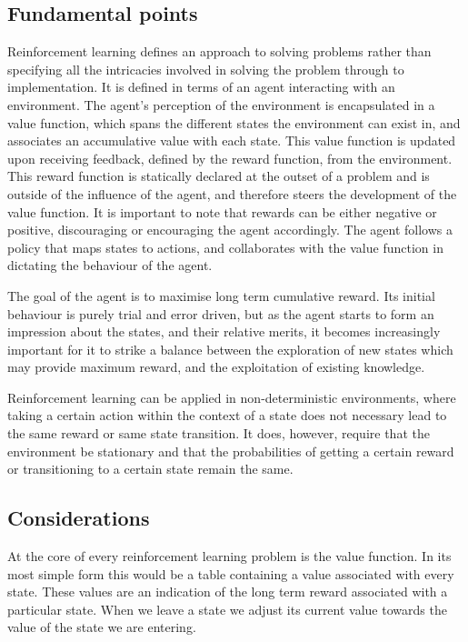 \documentclass[a4paper]{article}%
\begin{document}
\subsection{Fundamental points}
Reinforcement learning defines an approach to solving problems rather than specifying all the intricacies involved in solving the problem through to implementation. It is defined in terms of an agent interacting with an environment. The agent's perception of the environment is encapsulated in a value function, which spans the different states the environment can exist in, and associates an accumulative value with each state. This value function is updated upon receiving feedback, defined by the reward function, from the environment. This reward function is statically declared at the outset of a problem and is outside of the influence of the agent, and therefore steers the development of the value function. It is important to note that rewards can be either negative or positive, discouraging or encouraging the agent accordingly. The agent follows a policy that maps states to actions, and collaborates with the value function in dictating the behaviour of the agent\citep{suttonbarto}.

The goal of the agent is to maximise long term cumulative reward. Its initial behaviour is purely trial and error driven, but as the agent starts to form an impression about the states, and their relative merits, it becomes increasingly important for it to strike a balance between the exploration of new states which may provide maximum reward, and the exploitation of existing knowledge\citep{suttonbarto}.

Reinforcement learning can be applied in non-deterministic environments, where taking a certain action within the context of a state does not necessary lead to the same reward or same state transition. It does, however, require that the environment be stationary and that the probabilities of getting a certain reward or transitioning to a certain state remain the same\citep{kaelbling96reinforcement}.

\subsection{Considerations}

At the core of every reinforcement learning problem is the value function. In its most simple form this would be a table containing a value associated with every state.
These values are an indication of the long term reward associated with a particular state. When we leave a state we adjust its current value towards the value of the state we are entering. \\
\end{document}
